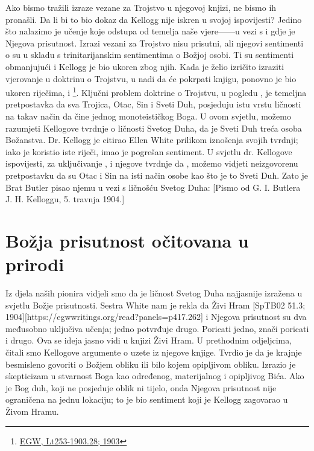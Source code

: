 Ako bismo tražili izraze vezane za Trojstvo u njegovoj knjizi, ne bismo ih pronašli. Da li bi to bio dokaz da Kellogg nije iskren u svojoj ispovijesti? Jedino što nalazimo je učenje koje odstupa od temelja naše vjere——u vezi s  i gdje je Njegova prisutnost. Izrazi vezani za Trojstvo nisu prisutni, ali njegovi sentimenti o  su u skladu s trinitarijanskim sentimentima o Božjoj osobi. Ti su sentimenti obmanjujući i Kellogg je bio ukoren zbog njih. Kada je želio izričito izraziti vjerovanje u doktrinu o Trojstvu, u nadi da će pokrpati knjigu, ponovno je bio ukoren riječima,  i \footnote{\href{https://egwwritings.org/?ref=en_Lt253-1903.28&para=9980.36}{EGW, Lt253-1903.28; 1903}}. Ključni problem doktrine o Trojstvu, u pogledu , je temeljna pretpostavka da sva Trojica, Otac, Sin i Sveti Duh, posjeduju istu vrstu ličnosti na takav način da čine jednog monoteističkog Boga. U ovom svjetlu, možemo razumjeti Kellogove tvrdnje o ličnosti Svetog Duha, da je Sveti Duh treća osoba Božanstva. Dr. Kellogg je citirao Ellen White prilikom iznošenja svojih tvrdnji; iako je koristio iste riječi, imao je pogrešan sentiment. U svjetlu dr. Kellogove ispovijesti, za uključivanje , i njegove tvrdnje da , možemo vidjeti neizgovorenu pretpostavku da su Otac i Sin na isti način osobe kao što je to Sveti Duh. Zato je Brat Butler pisao njemu u vezi s ličnošću Svetog Duha: [Pismo od G. I. Butlera J. H. Kelloggu, 5. travnja 1904.]

\section*{Božja prisutnost očitovana u prirodi}

Iz djela naših pionira vidjeli smo da je ličnost Svetog Duha najjasnije izražena u svjetlu Božje prisutnosti. Sestra White nam je rekla da Živi Hram [SpTB02 51.3; 1904][https://egwwritings.org/read?panels=p417.262]  i Njegova prisutnost su dva međusobno uključiva učenja; jedno potvrđuje drugo. Poricati jedno, znači poricati i drugo. Ova se ideja jasno vidi u knjizi Živi Hram. U prethodnim odjeljcima, čitali smo Kellogove argumente o  uzete iz njegove knjige. Tvrdio je da je krajnje besmisleno govoriti o Božjem obliku ili bilo kojem opipljivom obliku. Izrazio je skepticizam u stvarnost Boga kao određenog, materijalnog i opipljivog Bića. Ako je Bog duh, koji ne posjeduje oblik ni tijelo, onda Njegova prisutnost nije ograničena na jednu lokaciju; to je bio sentiment koji je Kellogg zagovarao u Živom Hramu.


